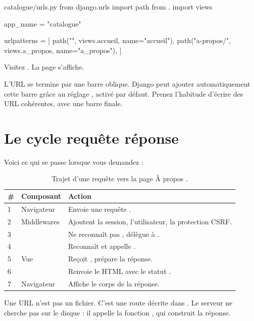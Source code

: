\begin{codebox}[python]{catalogue/urls.py}
from django.urls import path
from . import views

app_name = "catalogue"

urlpatterns = [
    path("", views.accueil, name="accueil"),
    path("a-propos/", views.a_propos, name="a_propos"),
]
\end{codebox}

Visitez . La page s'affiche.

\begin{note}
L'URL se termine par une barre oblique. Django peut ajouter automatiquement cette
barre grâce au réglage , activé par défaut. Prenez l'habitude
d'écrire des URL cohérentes, avec une barre finale.
\end{note}

\section{Le cycle requête réponse}

Voici ce qui se passe lorsque vous demandez  :

\begin{table}[htbp]
\centering
\small
\begin{tabularx}{\textwidth}{C{1.1cm} L{4.1cm} X}
\toprule
\textbf{\#} & \textbf{Composant} & \textbf{Action} \\
 & Navigateur & Envoie une requête . \\
2 & Middlewares & Ajoutent la session, l'utilisateur, la protection CSRF. \\
3 &  & Ne reconnaît pas , délègue à
. \\
4 &  & Reconnaît  et appelle
. \\
5 & Vue & Reçoit , prépare la réponse. \\
6 &  & Renvoie le HTML avec le statut . \\
7 & Navigateur & Affiche le corps de la réponse. \\
\bottomrule
\end{tabularx}
\caption{Trajet d'une requête vers la page \og À propos \fg.}
\end{table}

\begin{retenir}
Une URL n'est pas un fichier. C'est une route décrite dans . Le
serveur ne cherche pas  sur le disque : il appelle la fonction
, qui construit la réponse.
\end{retenir}

